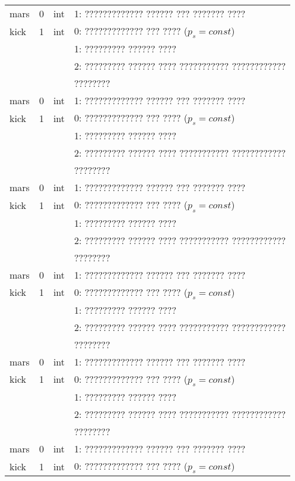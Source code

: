 \begin{longtable*}[c]{|l|c|l|l|}
    mars & 0 & int & 1: ????????????? ?????? ??? ??????? ????     \\
    kick & 1 & int & 0: ????????????? ??? ???? (\(p_s = const\)) \\
    &   &     & 1: ????????? ?????? ????                  \\
    &   &     & 2: ????????? ?????? ???? ??????????? ???????????? \\
    & & & ????????    \\
    mars & 0 & int & 1: ????????????? ?????? ??? ??????? ????     \\
    kick & 1 & int & 0: ????????????? ??? ???? (\(p_s = const\)) \\
    &   &     & 1: ????????? ?????? ????                  \\
    &   &     & 2: ????????? ?????? ???? ??????????? ???????????? \\
    & & & ????????    \\
    mars & 0 & int & 1: ????????????? ?????? ??? ??????? ????     \\
    kick & 1 & int & 0: ????????????? ??? ???? (\(p_s = const\)) \\
    &   &     & 1: ????????? ?????? ????                  \\
    &   &     & 2: ????????? ?????? ???? ??????????? ???????????? \\
    & & & ????????    \\
    mars & 0 & int & 1: ????????????? ?????? ??? ??????? ????     \\
    kick & 1 & int & 0: ????????????? ??? ???? (\(p_s = const\)) \\
    &   &     & 1: ????????? ?????? ????                  \\
    &   &     & 2: ????????? ?????? ???? ??????????? ???????????? \\
    & & & ????????    \\
    mars & 0 & int & 1: ????????????? ?????? ??? ??????? ????     \\
    kick & 1 & int & 0: ????????????? ??? ???? (\(p_s = const\)) \\
    &   &     & 1: ????????? ?????? ????                  \\
    &   &     & 2: ????????? ?????? ???? ??????????? ???????????? \\
    & & & ????????    \\
    mars & 0 & int & 1: ????????????? ?????? ??? ??????? ????     \\
    kick & 1 & int & 0: ????????????? ??? ???? (\(p_s = const\)) \\

\end{longtable*}
